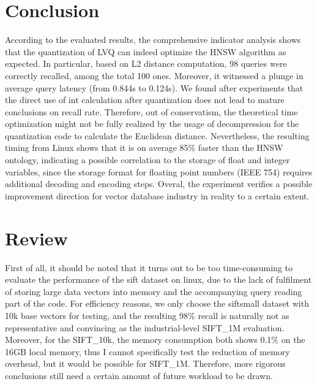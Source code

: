 \documentclass[sigconf, nonacm]{acmart}
\begin{document}
\section{Conclusion}
According to the evaluated results, the comprehensive indicator analysis shows that the quantization of LVQ can indeed optimize the HNSW algorithm as expected. In particular, based on L2 distance computation, 98 queries were correctly recalled, among the total 100 ones. Moreover, it witnessed a plunge in average query latency (from 0.844s to 0.124s).
We found after experiments that the direct use of int calculation after quantization does not lead to mature conclusions on recall rate. Therefore, out of conservatism, the theoretical time optimization might not be fully realized by the usage of decompression for the quantization code to calculate the Euclidean distance. Nevertheless, the resulting timing from Linux shows that it is on average 85\% faster than the HNSW ontology, indicating a possible correlation to the storage of float and integer variables, since the storage format for floating point numbers (IEEE 754) requires additional decoding and encoding steps.
Overal, the experiment verifies a possible improvement direction for vector database industry in reality to a certain extent.

\section{Review}
First of all, it should be noted that it turns out to be too time-consuming to evaluate the performance of the sift dataset on linux, due to the lack of fulfilment of storing large data vectors into memory and the accompanying query reading part of the code. For efficiency reasons, we only choose the siftsmall dataset with 10k base vectors for testing, and the resulting 98\% recall is naturally not as representative and convincing as the industrial-level SIFT\_1M evaluation. Moreover, for the SIFT\_10k, the memory consumption both shows 0.1\% on the 16GB local memory, thus I cannot specifically test the reduction of memory overhead, but it would be possible for SIFT\_1M. Therefore, more rigorous conclusions still need a certain amount of future workload to be drawn.
\end{document}
